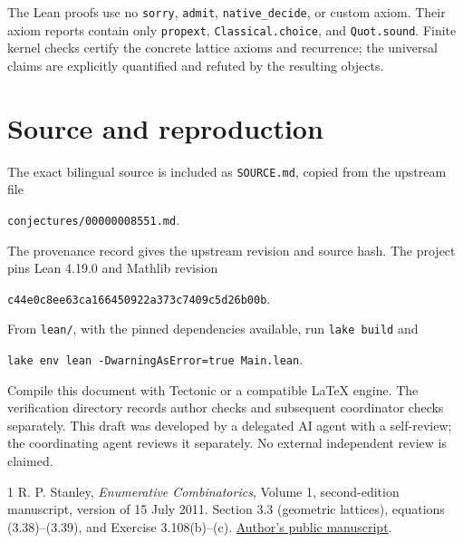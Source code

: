 \documentclass[11pt]{article}
\begin{document}
The Lean proofs use no \texttt{sorry}, \texttt{admit},
\texttt{native\_decide}, or custom axiom. Their axiom reports contain
only \texttt{propext}, \texttt{Classical.choice}, and
\texttt{Quot.sound}. Finite kernel checks certify the concrete lattice
axioms and recurrence; the universal claims are explicitly quantified
and refuted by the resulting objects.

\section*{Source and reproduction}
The exact bilingual source is included as \texttt{SOURCE.md}, copied
from the upstream file
\begin{center}\small\texttt{conjectures/00000008551.md}.\end{center}
The provenance record gives the upstream revision and source hash.
The project pins Lean 4.19.0 and Mathlib revision
\begin{center}\small\texttt{c44e0c8ee63ca166450922a373c7409c5d26b00b}.\end{center}
From \texttt{lean/}, with the pinned dependencies available, run
\texttt{lake build} and
\begin{center}\small\texttt{lake env lean -DwarningAsError=true Main.lean}.\end{center}
Compile this document with Tectonic or a compatible LaTeX engine.
The verification directory records author checks and subsequent
coordinator checks separately. This draft was developed by a delegated
AI agent with a self-review; the coordinating agent reviews it
separately. No external independent review is claimed.

\begin{thebibliography}{1}
 R. P. Stanley, \emph{Enumerative Combinatorics},
Volume 1, second-edition manuscript, version of 15 July 2011.
Section 3.3 (geometric lattices), equations (3.38)--(3.39),
and Exercise 3.108(b)--(c).
\href{https://math.mit.edu/~rstan/ec/ec1.pdf}{Author's public manuscript}.
\end{thebibliography}
\end{document}
